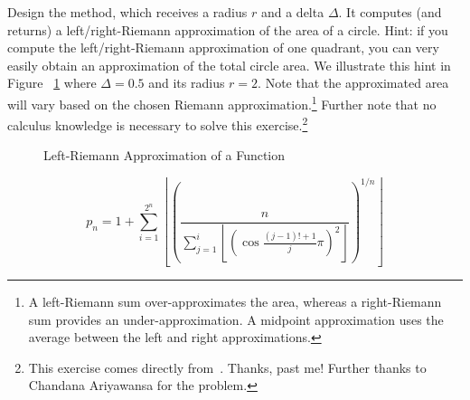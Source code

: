 Design the  method, which receives a radius $r$ and a delta $\Delta$. It computes (and returns) a left/right-Riemann approximation of the area of a circle. Hint: if you compute the left/right-Riemann approximation of one quadrant, you can very easily obtain an approximation of the total circle area. We illustrate this hint in Figure ~\ref{fig:circlearea} where $\Delta=0.5$ and its radius $r=2$. Note that the approximated area will vary based on the chosen Riemann approximation.\footnote{A left-Riemann sum over-approximates the area, whereas a right-Riemann sum provides an under-approximation. A midpoint approximation uses the average between the left and right approximations.} Further note that no calculus knowledge is necessary to solve this exercise.\footnote{This exercise comes directly from~. Thanks, past me! Further thanks to Chandana Ariyawansa for the problem.}

\begin{figure}[H]
\begin{center}

\end{center}
\caption{Left-Riemann Approximation of a Function}
\label{fig:circlearea}
\end{figure}


\[
p_n = 1 + \sum_{i=1}^{2^n}\left\lfloor\left(\frac{n}{\sum_{j=1}^{i}{\left\lfloor{\left({\cos{\frac{(j-1)! + 1}{j}\pi}}\right)^2}\right\rfloor}}\right)^{1/n}\right\rfloor
\]

